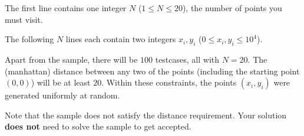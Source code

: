
The first line contains one integer $N$ ($1 \leq N \leq 20$), the number of points you must visit.

The following $N$ lines each contain two integers $x_i, y_i$ ($0 \leq x_i, y_i \leq 10^4$).

Apart from the sample, there will be $100$ testcases, all with $N = 20$. The 
(manhattan) distance between any two of the points (including the starting 
point $(0,0)$) will be at least $20$. Within these constraints, the points 
$(x_i, y_i)$ were generated uniformly at random.

Note that the sample does not satisfy the distance requirement. Your solution \textbf{does not} need to solve the sample to get accepted. 

